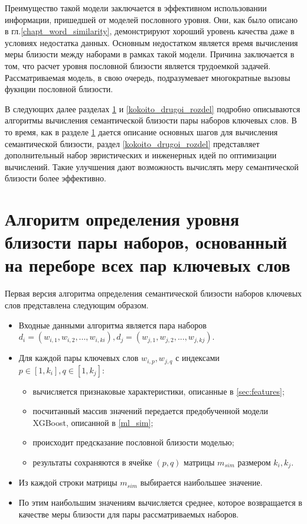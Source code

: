 Преимущество такой модели заключается в эффективном использовании информации, пришедшей от моделей пословного уровня. Они, как было описано в гл.\ref{chapt_word_similarity}, демонстрируют хороший уровень качества даже в условиях недостатка данных. Основным недостатком является время вычисления меры близости между наборами в рамках такой модели. Причина заключается в том, что расчет уровня пословной близости является трудоемкой задачей. Рассматриваемая модель, в свою очередь, подразумевает многократные вызовы фукнции пословной близости.

В следующих далее разделах \ref{kokoito_rozdel_pro_ologoritm} и \ref{kokoito_drugoi_rozdel} подробно описываются алгоритмы вычисления семантической близости пары наборов ключевых слов. В то время, как в разделе \ref{kokoito_rozdel_pro_ologoritm} дается описание основных шагов для вычисления семантической близости, раздел \ref{kokoito_drugoi_rozdel} представляет дополнительный набор эвристических и инженерных идей по оптимизации вычислений. Такие улучшения дают возможность вычислять меру семантической близости более эффективно.




\section{Алгоритм определения уровня близости пары наборов, основанный на переборе всех пар ключевых слов} \label{kokoito_rozdel_pro_ologoritm}
Первая версия алгоритма определения семантической близости наборов ключевых слов представлена следующим образом.
\begin{itemize}
    \item Входные данными алгоритма является пара наборов $d_i = (w_{i,1},w_{i,2},...,w_{i,ki}), d_j = (w_{j,1},w_{j,2},...,w_{j,kj})$.
    \item Для каждой пары ключевых слов $w_{i,p}, w_{j,q}$ с индексами $p \in [1, k_i], q \in [1, k_j]$:
        \begin{itemize}
            \item вычисляется признаковые характеристики, описанные в \ref{sec:features};
            \item посчитанный массив значений передается предобученной модели XGBoost, описанной в \ref{ml_sim};
            \item происходит предсказание пословной близости моделью;
            \item результаты сохраняются в ячейке $(p, q)$ матрицы $m_{sim}$ размером $k_i, k_j$.
        \end{itemize}
    \item Из каждой строки матрицы $m_{sim}$ выбирается наибольшее значение.
    \item По этим наибольшим значениям вычисляется среднее, которое возвращается в качестве меры близости для пары рассматриваемых наборов.
\end{itemize}

